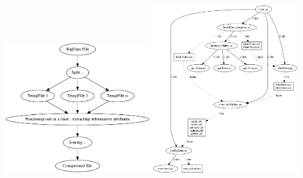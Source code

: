 \documentclass[sansserif,mathserif]{beamer}
\begin{document}
\begin{frame}
\begin{columns}
\begin{column}{0.309\textwidth}
\begin{center}
\vspace{-0.3cm}
\includegraphics[width=0.49\textwidth]{filebreak.png} \hspace{-.0cm}
\includegraphics[width=0.49\textwidth]{fileTreedetail.png}
\vspace{-0.7cm}
\end{center}

\vspace{0.2cm}
\end{column}


\begin{column}{0.309\textwidth}
\vspace{-1.4cm}


\end{column}
\end{columns}
\end{frame}
\end{document}
